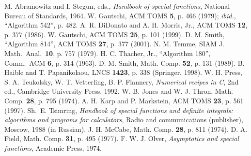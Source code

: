 \documentclass{llncs}
\begin{document}
\begin{thebibliography}{10}
M. Abramowitz and I. Stegun, eds., \emph{Handbook of special functions},
National Bureau of Standards, 1964.
W. Gautschi, ACM TOMS \textbf{5}, p. 466 (1979); \emph{ibid.}, {}``Algorithm
542'', p. 482.
A. R. DiDonato and A. H. Morris, Jr., ACM TOMS \textbf{12}, p. 377
(1986).
W. Gautschi, ACM TOMS \textbf{25}, p. 101 (1999).
D. M. Smith, {}``Algorithm 814'', ACM TOMS \textbf{27}, p. 377 (2001).
N. M. Temme, SIAM J. Math.~Anal.~\textbf{10}, p. 757 (1979).
H. C. Thacher, Jr., {}``Algorithm 180'', Comm.~ACM \textbf{6},
p. 314 (1963).
D. M. Smith, Math. Comp. \textbf{52}, p. 131 (1989).
B. Haible and T. Papanikolaou, LNCS \textbf{1423}, p. 338 (Springer,
1998).
W. H. Press, S. A. Teukolsky, W. T. Vetterling, B. P. Flannery, \emph{Numerical
recipes in C}, 2nd ed., Cambridge University Press, 1992.
W. B. Jones and W. J. Thron, Math. Comp. \textbf{28}, p. 795 (1974).
A. H. Karp and P. Markstein, ACM TOMS \textbf{23}, p. 561 (1997). 
Sh.~E. Tsimring, \emph{Handbook of special functions and definite
integrals: algorithms and programs for calculators}, Radio and communications
(publisher), Moscow, 1988 (in Russian).
J. H. McCabe, Math. Comp. \textbf{28}, p. 811 (1974).
D. A. Field, Math. Comp. \textbf{31}, p. 495 (1977).
F. W. J. Olver, \emph{Asymptotics and special functions}, Academic
Press, 1974.\end{thebibliography}
\end{document}
